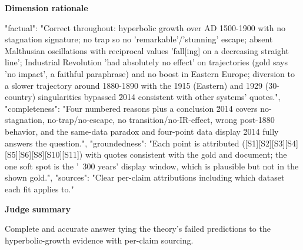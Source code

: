 \documentclass[10pt]{article}
\begin{document}
\textbf{Dimension rationale}
\begin{EvidenceText}
{
  "factual": "Correct throughout: hyperbolic growth over AD 1500-1900 with no stagnation signature; no trap so no 'remarkable'/'stunning' escape; absent Malthusian oscillations with reciprocal values 'fall[ing] on a decreasing straight line'; Industrial Revolution 'had absolutely no effect' on trajectories (gold says 'no impact', a faithful paraphrase) and no boost in Eastern Europe; diversion to a slower trajectory around 1880-1890 with the 1915 (Eastern) and 1929 (30-country) singularities bypassed \u2014 consistent with other systems' quotes.",
  "completeness": "Four numbered reasons plus a conclusion \u2014 covers no-stagnation, no-trap/no-escape, no transition/no-IR-effect, wrong post-1880 behavior, and the same-data paradox and four-point data display \u2014 fully answers the question.",
  "groundedness": "Each point is attributed ([S1][S2][S3][S4][S5][S6][S8][S10][S11]) with quotes consistent with the gold and document; the one soft spot is the '~300 years' display window, which is plausible but not in the shown gold.",
  "sources": "Clear per-claim attributions including which dataset each fit applies to."
}
\end{EvidenceText}

\textbf{Judge summary}
\begin{EvidenceText}
Complete and accurate answer tying the theory's failed predictions to the hyperbolic-growth evidence with per-claim sourcing.
\end{EvidenceText}
\end{document}

